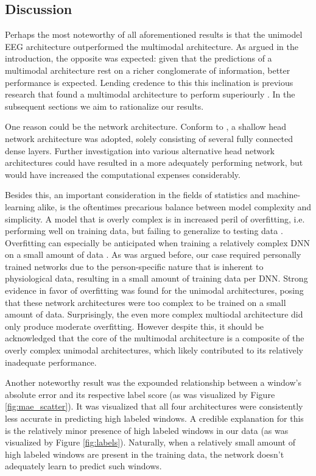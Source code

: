 \documentclass[fleqn,11pt]{paper}
\begin{document}
\subsection{Discussion}
Perhaps the most noteworthy of all aforementioned results is that the unimodel EEG architecture outperformed the multimodal architecture. As argued in the introduction, the opposite was expected: given that the predictions of a multimodal architecture rest on a richer conglomerate of information, better performance is expected. Lending credence to this this inclination is previous research that found a multimodal architecture to perform superiourly \cite{dolmans2020perceived, han2020classification, rastgoo2019automatic, yin2017recognition}. In the subsequent sections we aim to rationalize our results.

One reason could be the network architecture. Conform to  , a shallow head network architecture was adopted, solely consisting of several fully connected dense layers. Further investigation into various alternative head network architectures could have resulted in a more adequately performing network,  but would have increased the computational expenses considerably. 

Besides this, an important consideration in the fields of statistics and machine-learning alike, is the oftentimes precarious balance between model complexity and simplicity. A model that is overly complex is in increased peril of overfitting, i.e. performing well on training data, but failing to generalize to testing data \cite{lever2016points}. Overfitting can especially be anticipated when training a relatively complex DNN on a small amount of data \cite{feng2019using,aggarwal2018neural}. As was argued before,  our case required personally trained networks due to the person-specific nature that is inherent to physiological data, resulting in a small amount of training data per DNN. Strong evidence in favor of overfitting was found for the unimodal architectures, posing that these network architectures were too complex to be trained on a small amount of data. Surprisingly, the even more complex multiodal architecture did only produce moderate overfitting. However despite this, it should be acknowledged that the core of the multimodal architecture is a composite of the overly complex unimodal architectures, which likely contributed to its relatively inadequate performance.

Another noteworthy result was the expounded relationship between a window's absolute error and its respective label score (as was visualized by Figure \ref{fig:mae_scatter}). It was visualized that all four architectures were consistently less accurate in predicting high labeled windows.  A credible explanation for this is the relatively minor presence of high labeled windows in our data (as was visualized by Figure \ref{fig:labels}). Naturally, when a relatively small amount of high labeled windows are present in the training data, the network doesn't adequately learn to predict such windows. 
\end{document}
